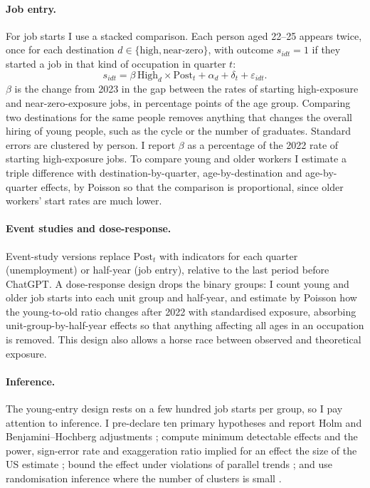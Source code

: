 \documentclass[11pt]{article}
\begin{document}
\paragraph{Job entry.} For job starts I use a stacked comparison. Each person aged 22--25 appears twice, once for each destination $d \in \{\text{high}, \text{near-zero}\}$, with outcome $s_{idt}=1$ if they started a job in that kind of occupation in quarter $t$:
\begin{equation}\label{eq:entry}
  s_{idt} = \beta\, \mathrm{High}_d \times \mathrm{Post}_t + \alpha_d + \delta_t + \varepsilon_{idt}.
\end{equation}
$\beta$ is the change from 2023 in the gap between the rates of starting high-exposure and near-zero-exposure jobs, in percentage points of the age group. Comparing two destinations for the same people removes anything that changes the overall hiring of young people, such as the cycle or the number of graduates. Standard errors are clustered by person. I report $\beta$ as a percentage of the 2022 rate of starting high-exposure jobs. To compare young and older workers I estimate a triple difference with destination-by-quarter, age-by-destination and age-by-quarter effects, by Poisson so that the comparison is proportional, since older workers' start rates are much lower.

\paragraph{Event studies and dose-response.} Event-study versions replace $\mathrm{Post}_t$ with indicators for each quarter (unemployment) or half-year (job entry), relative to the last period before ChatGPT. A dose-response design drops the binary groups: I count young and older job starts into each unit group and half-year, and estimate by Poisson how the young-to-old ratio changes after 2022 with standardised exposure, absorbing unit-group-by-half-year effects so that anything affecting all ages in an occupation is removed. This design also allows a horse race between observed and theoretical exposure.

\paragraph{Inference.} The young-entry design rests on a few hundred job starts per group, so I pay attention to inference. I pre-declare ten primary hypotheses and report Holm and Benjamini--Hochberg adjustments \citep{holm1979,benjamini1995}; compute minimum detectable effects and the power, sign-error rate and exaggeration ratio implied for an effect the size of the US estimate \citep{gelman2014}; bound the effect under violations of parallel trends \citep{rambachan2023}; and use randomisation inference where the number of clusters is small \citep{young2019}.
\end{document}
